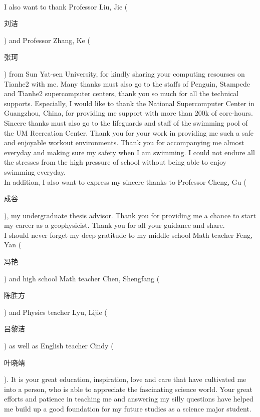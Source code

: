 \\
I also want to thank Professor Liu, Jie (\begin{CJK}{UTF8}{gbsn}刘洁\end{CJK}) and Professor Zhang, Ke (\begin{CJK}{UTF8}{gbsn}张珂\end{CJK}) from Sun Yat-sen University, for kindly sharing your computing resourses on Tianhe2 with me. Many thanks must also go to the staffs of Penguin, Stampede and Tianhe2 supercomputer centers, thank you so much for all the technical supports. Especially, I would like to thank the National Supercomputer Center in Guangzhou, China, for providing me support with more than 200k of core-hours. 
\\
Sincere thanks must also go to the lifeguards and staff of the swimming pool of the UM Recreation Center. Thank you for your work in providing me such a safe and enjoyable workout environments. Thank you for accompanying me almost everyday and making sure my safety when I am swimming. I could not endure all the stresses from the high pressure of school without being able to enjoy swimming everyday.  
\\
In addition, I also want to express my sincere thanks to Professor Cheng, Gu (\begin{CJK}{UTF8}{gbsn}成谷\end{CJK}), my undergraduate thesis advisor. Thank you for providing me a chance to start my career as a geophysicist. Thank you for all your guidance and share. 
\\
I should never forget my deep gratitude to my middle school Math teacher Feng, Yan (\begin{CJK}{UTF8}{gbsn}冯艳\end{CJK}) and high school Math teacher Chen, Shengfang (\begin{CJK}{UTF8}{gbsn}陈胜方\end{CJK}) and Physics teacher Lyu, Lijie (\begin{CJK}{UTF8}{gbsn}吕黎洁\end{CJK}) as well as English teacher Cindy (\begin{CJK}{UTF8}{gbsn}叶晓靖\end{CJK}). It is your great education, inspiration, love and care that have cultivated me into a person, who is able to appreciate the fascinating science world. Your great efforts and patience in teaching me and answering my silly questions have helped me build up a good foundation for my future studies as a science major student.
